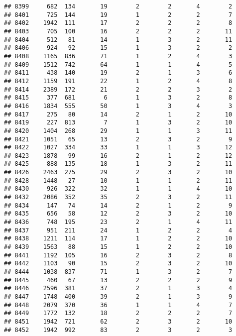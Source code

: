 \documentclass[]{article}
\begin{document}
\begin{verbatim}
## 8399     682  134       19        2        2       4        2
## 8401     725  144       19        1        2       2        7
## 8402    1942  111       17        2        2       2        8
## 8403     705  100       16        2        2       2       11
## 8404     512   81       14        1        3       2       11
## 8406     924   92       15        1        3       2        2
## 8408    1165  836       71        1        2       4        3
## 8409    1512  742       64        1        1       4        5
## 8411     438  140       19        2        1       3        6
## 8412    1159  191       22        1        2       4        8
## 8414    2389  172       21        2        2       3        2
## 8415     377  681        6        1        3       2        8
## 8416    1834  555       50        1        3       4        3
## 8417     275   80       14        2        1       2       10
## 8419     227  813        7        1        3       2       10
## 8420    1404  268       29        1        1       3       11
## 8421    1051   65       13        2        3       2        9
## 8422    1027  334       33        1        1       3       12
## 8423    1878   99       16        2        1       2       12
## 8425     888  135       18        1        3       2       11
## 8426    2463  275       29        2        3       2       10
## 8428    1448   27       10        1        1       2       11
## 8430     926  322       32        1        1       4       10
## 8432    2086  352       35        2        3       2       11
## 8434     147   74       14        2        1       2        9
## 8435     656   58       12        2        3       2       10
## 8436     748  195       23        2        1       4       11
## 8437     951  211       24        1        2       2        4
## 8438    1211  114       17        1        2       2       10
## 8439    1563   88       15        1        2       2       10
## 8441    1192  105       16        2        3       2        8
## 8442    1103   90       15        2        3       2       10
## 8444    1038  837       71        1        3       2        7
## 8445     460   67       13        2        2       2        9
## 8446    2596  381       37        2        1       3        4
## 8447    1748  400       39        2        1       3        9
## 8448    2079  370       36        1        1       4        7
## 8449    1772  132       18        2        2       2        7
## 8451    1942  721       62        2        3       2       10
## 8452    1942  992       83        2        3       2        3

\end{verbatim}
\end{document}
